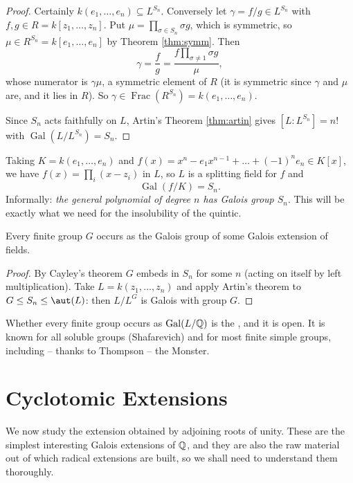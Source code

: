 \documentclass[a4paper]{scrartcl}
\newcommand{\Gal}{\operatorname{Gal}}
\newcommand{\Frac}{\operatorname{Frac}}
\begin{document}
\begin{proof}
	Certainly $k(e_1,\dots,e_n)\subseteq L^{S_n}$. Conversely let $\gamma = f/g \in L^{S_n}$ with $f, g \in R = k[z_1,\dots,z_n]$. Put $\mu = \prod_{\sigma\in S_n}\sigma g$, which is symmetric, so $\mu \in R^{S_n} = k[e_1,\dots,e_n]$ by Theorem \ref{thm:symm}. Then
	$$\gamma = \frac{f}{g} = \frac{f \prod_{\sigma\neq 1}\sigma g}{\mu},$$
	whose numerator is $\gamma\mu$, a symmetric element of $R$ (it is symmetric since $\gamma$ and $\mu$ are, and it lies in $R$). So $\gamma \in \Frac(R^{S_n}) = k(e_1,\dots,e_n)$.

	Since $S_n$ acts faithfully on $L$, Artin's Theorem \ref{thm:artin} gives $[L:L^{S_n}] = n!$ with $\Gal(L/L^{S_n}) = S_n$.
\end{proof}

Taking $K = k(e_1,\dots,e_n)$ and $f(x) = x^n - e_1x^{n-1}+\dots+(-1)^ne_n \in K[x]$, we have $f(x) = \prod_i (x - z_i)$ in $L$, so $L$ is a splitting field for $f$ and
$$\Gal(f/K) = S_n.$$
Informally: \emph{the general polynomial of degree $n$ has Galois group $S_n$}. This will be exactly what we need for the insolubility of the quintic.

\begin{corollary}
	Every finite group $G$ occurs as the Galois group of some Galois extension of fields.
\end{corollary}

\begin{proof}
	By Cayley's theorem $G$ embeds in $S_n$ for some $n$ (acting on itself by left multiplication). Take $L = k(z_1,\dots,z_n)$ and apply Artin's theorem to $G \leq S_n \leq \aut(L)$: then $L/L^G$ is Galois with group $G$.
\end{proof}

Whether every finite group occurs as $\Gal(L/\Q)$ is the , and it is open. It is known for all soluble groups (Shafarevich) and for most finite simple groups, including -- thanks to Thompson -- the Monster.

\section{Cyclotomic Extensions}\label{sec:cyclotomic}

We now study the extension obtained by adjoining roots of unity. These are the simplest interesting Galois extensions of $\mathbb{Q}$, and they are also the raw material out of which radical extensions are built, so we shall need to understand them thoroughly.
\end{document}
